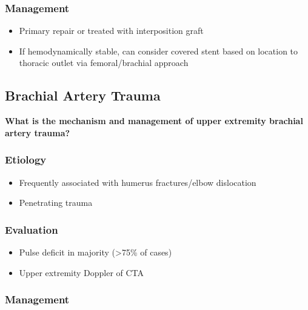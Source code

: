 \documentclass[
]{book}
\begin{document}
\hypertarget{management-7}{%
\subsubsection{Management}\label{management-7}}

\begin{itemize}
\item
  Primary repair or treated with interposition graft
\item
  If hemodynamically stable, can consider covered stent based on
  location to thoracic outlet via femoral/brachial approach
\end{itemize}

\hypertarget{brachial-artery-trauma}{%
\subsection{Brachial Artery Trauma}\label{brachial-artery-trauma}}

\textbf{What is the mechanism and management of upper extremity brachial
artery trauma?}

\hypertarget{etiology-6}{%
\subsubsection{Etiology}\label{etiology-6}}

\begin{itemize}
\item
  Frequently associated with humerus fractures/elbow dislocation
\item
  Penetrating trauma
\end{itemize}

\hypertarget{evaluation-7}{%
\subsubsection{Evaluation}\label{evaluation-7}}

\begin{itemize}
\item
  Pulse deficit in majority (\textgreater75\% of cases)
\item
  Upper extremity Doppler of CTA
\end{itemize}

\hypertarget{management-8}{%
\subsubsection{Management}\label{management-8}}
\end{document}
